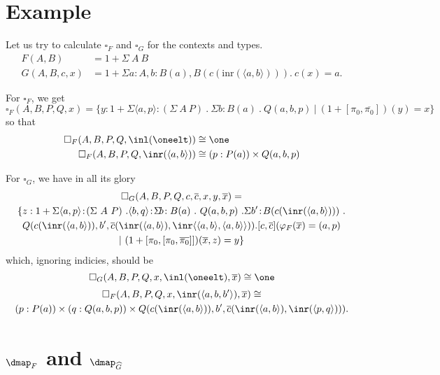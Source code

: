 \documentclass{article}
\begin{document}
\section{Example}

Let us try to calculate $\square_F$ and $\square_G$ for the contexts and types.
\begin{align*}
  F(A, B) &= 1 + \Sigma\ A\ B \\
  G(A, B, c, x) &= 1 + \Sigma a : A, b : B(a), B(c (\text{inr}(\langle a, b\rangle))).\ c(x) = a.
\end{align*}

For $\square_F$, we get
\[
\square_F(A, B, P, Q, x) = \{ y : 1 + \Sigma \langle a, p\rangle\!:\!(\Sigma\ A\ P)\ .\ \Sigma\!b\!: B(a)\ .\ Q(a, b, p)\ |\ (1 + [\pi_0, \overline{\pi_0}])(y) = x \}
\]
so that
\begin{align*}
  \square_F(A, B, P, Q, \inl(\oneelt)) &\cong \one \\
  \square_F(A, B, P, Q, \inr(\langle a, b\rangle)) &\cong (p : P(a)) \times Q(a, b, p)
\end{align*}

For $\square_G$, we have in all its glory
\begin{multline*}
  \square_G(A, B, P, Q, c, \overline{c}, x, y, \overline{x}) = \\
  \{ z : 1 + \Sigma \langle a, p\rangle\!:\!(\Sigma\ A\ P)\ . \langle
  b, q\rangle\!:\! \Sigma\!b\!: B(a)\ .\ Q(a, b, p)\ . 
  \Sigma b'\!:\!B(c(\inr(\langle a, b\rangle)))\ . \\ Q(c(\inr(\langle a,
  b\rangle)), b', \overline{c}(\inr(\langle a, b\rangle),
  \inr\langle\langle a, b\rangle, \langle a, b\rangle\rangle)).  
  [c, \overline{c}](\varphi_F(\overline{x}) = (a, p) \\|\ (1 + [\pi_0, [\pi_0, \overline{\pi_0}]])(\overline{x}, z) = y \}
\end{multline*}
which, ignoring indicies, should be
\[
  \square_G(A, B, P, Q, x, \inl(\oneelt), \overline{x}) \cong \one
\]\vskip -1cm
\begin{multline*}
  \square_F(A, B, P, Q, x, \inr(\langle a, b, b'\rangle), \overline{x}) \cong \\
(p : P(a)) \times (q : Q(a, b, p)) \times Q(c(\inr(\langle a, b\rangle)), b', \overline{c}(\inr(\langle a, b\rangle), \inr(\langle p, q\rangle))).
\end{multline*}

\section{$\dmap_F$ and $\dmap_{\widehat{G}}$}
\end{document}
